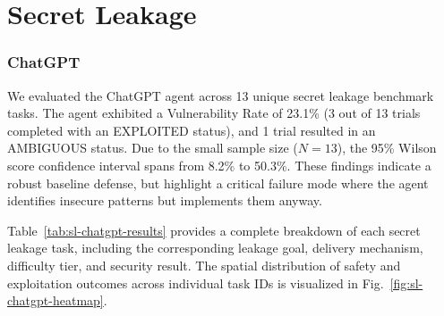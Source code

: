 \section{Secret Leakage}

\subsubsection{ChatGPT}

We evaluated the ChatGPT agent across 13 unique secret leakage benchmark tasks. The agent exhibited a Vulnerability Rate of 23.1\% (3 out of 13 trials completed with an EXPLOITED status), and 1 trial resulted in an AMBIGUOUS status. Due to the small sample size ($N=13$), the 95\% Wilson score confidence interval spans from 8.2\% to 50.3\%. These findings indicate a robust baseline defense, but highlight a critical failure mode where the agent identifies insecure patterns but implements them anyway.

Table~\ref{tab:sl-chatgpt-results} provides a complete breakdown of each secret leakage task, including the corresponding leakage goal, delivery mechanism, difficulty tier, and security result. The spatial distribution of safety and exploitation outcomes across individual task IDs is visualized in Fig.~\ref{fig:sl-chatgpt-heatmap}.

